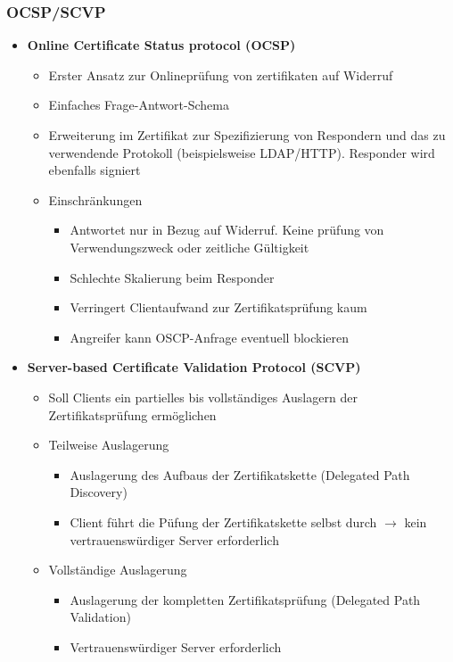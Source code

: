 \subsubsection{OCSP/SCVP}
\begin{itemize}
	\item \textbf{Online Certificate Status protocol (OCSP)}
	\begin{itemize}
		\item Erster Ansatz zur Onlineprüfung von zertifikaten auf Widerruf
		\item Einfaches Frage-Antwort-Schema
		\item Erweiterung im Zertifikat zur Spezifizierung von Respondern und das zu verwendende Protokoll (beispielsweise LDAP/HTTP). Responder wird ebenfalls signiert
		\item Einschränkungen
		\begin{itemize}
			\item Antwortet nur in Bezug auf Widerruf. Keine prüfung von Verwendungszweck oder zeitliche Gültigkeit
			\item Schlechte Skalierung beim Responder
			\item Verringert Clientaufwand zur Zertifikatsprüfung kaum
			\item Angreifer kann OSCP-Anfrage eventuell blockieren
		\end{itemize}
	\end{itemize}
	\item \textbf{Server-based Certificate Validation Protocol (SCVP)}
	\begin{itemize}
		\item Soll Clients ein partielles bis vollständiges Auslagern der Zertifikatsprüfung ermöglichen
		\item Teilweise Auslagerung
		\begin{itemize}
			\item Auslagerung des Aufbaus der Zertifikatskette (Delegated Path Discovery)
			\item Client führt die Püfung der Zertifikatskette selbst durch \(\rightarrow\) kein vertrauenswürdiger Server erforderlich
		\end{itemize}
		\item Vollständige Auslagerung
		\begin{itemize}
			\item Auslagerung der kompletten Zertifikatsprüfung (Delegated Path Validation)
			\item Vertrauenswürdiger Server erforderlich
		\end{itemize}
	\end{itemize}
\end{itemize}



